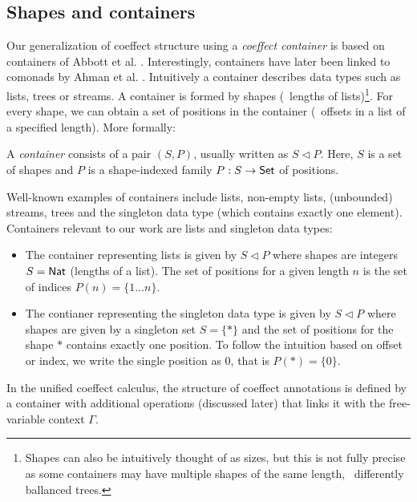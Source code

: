 \subsection{Shapes and containers}
Our generalization of coeffect structure using a \emph{coeffect container} is based on containers of 
Abbott et al. \cite{types-containers}. Interestingly, containers have later been linked
to comonads by Ahman et al. \cite{comonads-containers}. Intuitively a container describes data
types such as lists, trees or streams. A container is formed by shapes (\eg~lengths of 
lists)\footnote{Shapes can also be intuitively thought of as sizes, but this is not fully precise 
as some containers may have multiple shapes of the same length, \eg~differently ballanced trees.}.
For every shape, we can obtain a set of positions in the container (\eg~offsets in a list of a
specified length). More formally:

\begin{definition}
A \emph{container} consists of a pair $(S,P)$, usually written as $S \triangleleft P$. 
Here, $S$ is a set of shapes and $P$ is a shape-indexed family $P : S \rightarrow \textnormal{\sffamily Set}$ 
of positions.
\end{definition}

\noindent
Well-known examples of containers include lists, non-empty lists, (un\-boun\-ded) streams,
trees and the singleton data type (which contains exactly one element). Containers relevant 
to our work are lists and singleton data types:

\begin{itemize}
\item The container representing lists is given by $S \triangleleft P$ where 
  shapes are integers $S = \ident{Nat}$ (lengths of a list). The set of positions for a 
  given length $n$ is the set of indices $P(n)= \{ 1 \ldots n \}$.

\item The contianer representing the singleton data type is given by $S \triangleleft P$ where
  shapes are given by a singleton set $S = \{ \ast \}$ and the set of positions for the
  shape $\ast$ contains exactly one position. To follow the intuition based on offset or 
  index, we write the single position as $0$, that is $P(\ast) = \{ 0 \}$.
\end{itemize}

\noindent
In the unified coeffect calculus, the structure of coeffect annotations is defined by a 
container with additional operations (discussed later) that links it with the free-variable 
context $\Gamma$. 

